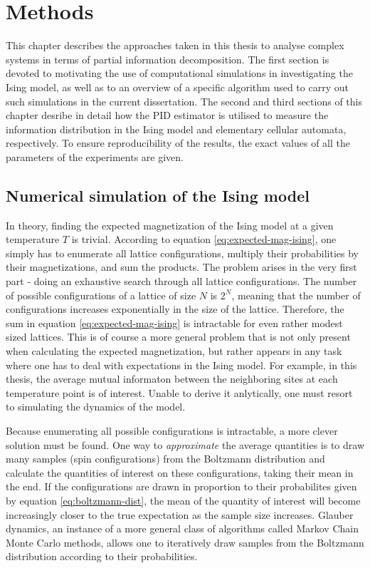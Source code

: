 \documentclass[12pt]{article}
\begin{document}
\newpage
\section{Methods}

This chapter describes the approaches taken in this thesis to analyse complex systems in terms of partial information decomposition. The first section is devoted to motivating the use of computational simulations in investigating the Ising model, as well as to an overview of a specific algorithm used to carry out such simulations in the current dissertation. The second and third sections of this chapter desribe in detail how the PID estimator is utilised to measure the information distribution in the Ising model and elementary cellular automata, respectively. To ensure reproducibility of the results, the exact values of all the parameters of the experiments are given. 

\subsection{Numerical simulation of the Ising model}

In theory, finding the expected magnetization of the Ising model at a given temperature $T$ is trivial. According to equation \ref{eq:expected-mag-ising}, one simply has to enumerate all lattice configurations, multiply their probabilities by their magnetizations, and sum the products. The problem arises in the very first part - doing an exhaustive search through all lattice configurations. The number of possible configurations of a lattice of size $N$ is $2^N$, meaning that the number of configurations increases exponentially in the size of the lattice. Therefore, the sum in equation \ref{eq:expected-mag-ising} is intractable for even rather modest sized lattices. This is of course a more general problem that is not only present when calculating the expected magnetization, but rather appears in any task where one has to deal with expectations in the Ising model. For example, in this thesis, 
the average mutual informaton between the neighboring sites at each temperature point is of interest. Unable to derive it anlytically, one must resort to simulating the dynamics of the model. 

Because enumerating all possible configurations is intractable, a more clever solution must be found. One way to \textit{approximate} the average quantities is to draw many samples (spin configurations) from the Boltzmann distribution and calculate the quantities of interest on these configurations, taking their mean in the end. If the configurations are drawn in proportion to their probabilites given by equation \ref{eq:boltzmann-dist}, the mean of the quantity of interest will become increasingly closer to the true expectation as the sample size increases. Glauber dynamics, an instance of a more general class of algorithms called Markov Chain Monte Carlo methods, allows one to iteratively draw samples from the Boltzmann distribution according to their probabilities.
\end{document}
